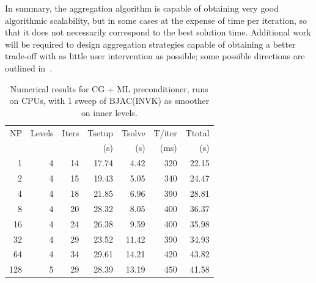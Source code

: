 In summary, the aggregation algorithm is capable of obtaining very
good algorithmic scalability, but in some cases at the expense of time
per iteration, so that it does not necessarily correspond to the best
solution time. 
Additional work will be required to design aggregation
strategies capable of obtaining a better trade-off with as little user
intervention as possible; some possible directions are outlined
in~\cite{bcm-toms}.  




\iffalse
\begin{table}[h!]
\centering
\caption{Numerical results for CG + ML preconditioner, runs on CPUs, with 1 sweep of BJAC(INVK) as smoother on inner levels.}
\label{cpu-invk}

\begin{tabular}{rrrrrrr}
NP  & Levels & Iters & Tsetup & Tsolve & T/iter & Ttotal \\
    &        &       & (s)    & (s)    & (ms)   & (s)    \\
\hline
1   & 4       & 14  & 17.74 & 4.42  & 320      & 22.15   \\
2   & 4       & 15  & 19.43 & 5.05  & 340      & 24.47   \\
4   & 4       & 18  & 21.85 & 6.96  & 390      & 28.81   \\
8   & 4       & 20  & 28.32 & 8.05  & 400      & 36.37   \\
16  & 4       & 24  & 26.38 & 9.59  & 400      & 35.98   \\
32  & 4       & 29  & 23.52 & 11.42 & 390      & 34.93   \\
64  & 4       & 34  & 29.61 & 14.21 & 420      & 43.82   \\
128 & 5       & 29  & 28.39 & 13.19 & 450      & 41.58    \\
\hline
\end{tabular}
\end{table}

